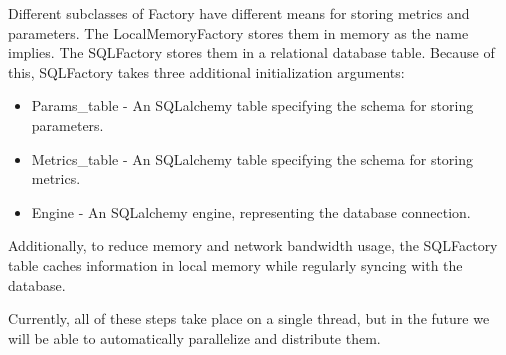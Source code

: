 \documentclass[letterpaper,10pt,english]{sphinxmanual}
\begin{document}
Different subclasses of Factory have different means for storing metrics and parameters. The LocalMemoryFactory stores them in memory as the
name implies. The SQLFactory stores them in a relational database table. Because of this, SQLFactory takes three additional initialization arguments:
\begin{itemize}
\item {} 
Params\_table - An SQLalchemy table specifying the schema for storing parameters.

\item {} 
Metrics\_table - An SQLalchemy table specifying the schema for storing metrics.

\item {} 
Engine - An SQLalchemy engine, representing the database connection.

\end{itemize}

Additionally, to reduce memory and network bandwidth usage, the SQLFactory table caches information in local memory while regularly syncing
with the database.

Currently, all of these steps take place on a single thread, but in the future we will be able to automatically parallelize and distribute them.

\label{\detokenize{Fireworks:module-Fireworks.extensions.factory}}
\end{document}
